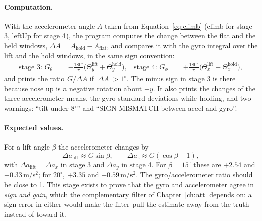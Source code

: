 \documentclass[11pt,a4paper]{report}
\begin{document}
\paragraph{Computation.} With the accelerometer angle $A$ taken from Equation~\eqref{eq:climb} (climb for stage 3, leftUp for stage 4), the program computes the change between the flat and the held windows, $\Delta A=A_{\mathrm{hold}}-A_{\mathrm{flat}}$, and compares it with the gyro integral over the lift and the hold windows, in the same sign convention:
\begin{align}
  \text{stage 3: } G_\theta&=-\frac{180^\circ}{\pi}\bigl(\Theta_y^{\mathrm{lift}}+\Theta_y^{\mathrm{hold}}\bigr), &
  \text{stage 4: } G_\phi&=+\frac{180^\circ}{\pi}\bigl(\Theta_x^{\mathrm{lift}}+\Theta_x^{\mathrm{hold}}\bigr),
\end{align}
and prints the ratio $G/\Delta A$ if $|\Delta A|>1^\circ$. The minus sign in stage 3 is there because nose up is a negative rotation about $+y$. It also prints the changes of the three accelerometer means, the gyro standard deviations while holding, and two warnings: ``tilt under 8$^\circ$'' and ``SIGN MISMATCH between accel and gyro''.

\paragraph{Expected values.} For a lift angle $\beta$ the accelerometer changes by
\begin{equation}
  \Delta a_{\mathrm{lift}}\approx G\sin\beta,\qquad \Delta a_z\approx G(\cos\beta-1), \label{eq:tiltexp}
\end{equation}
with $\Delta a_{\mathrm{lift}}=\Delta a_x$ in stage 3 and $\Delta a_y$ in stage 4. For $\beta=15^\circ$ these are $+2.54$ and $-0.33$\,m/s$^2$; for $20^\circ$, $+3.35$ and $-0.59$\,m/s$^2$. The gyro/accelerometer ratio should be close to 1. This stage exists to prove that the gyro and accelerometer agree in \emph{sign and gain}, which the complementary filter of Chapter~\ref{ch:att} depends on: a sign error in either would make the filter pull the estimate away from the truth instead of toward it.
\end{document}
